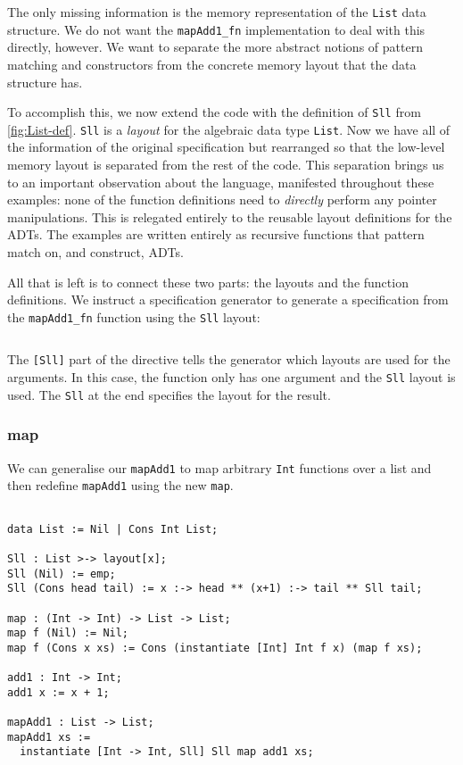 \noindent
The only missing information is the memory representation of the \verb|List| data structure. We do not want the
\verb|mapAdd1_fn| implementation to deal with this directly, however. We want to separate the more abstract notions
of pattern matching and constructors from the concrete memory layout that the data structure has.

To accomplish this, we now extend the code with the definition of
\verb|Sll| from \autoref{fig:List-def}. \verb|Sll| is a
\textit{layout} for the algebraic data type \verb|List|.
%
Now we have all of the information of the original specification but
rearranged so that the low-level memory layout is separated from the
rest of the code. This separation brings us to an important
observation about the language, manifested throughout these examples:
none of the function definitions need to \emph{directly} perform any
pointer manipulations. This is relegated entirely to the reusable
layout definitions for the ADTs. The examples are written entirely as
recursive functions that pattern match on, and construct, ADTs.

All that is left is to connect these two parts: the layouts and the
function definitions. We instruct a \SuSLik{} specification generator to
generate a \SuSLik{} specification from the \verb|mapAdd1_fn| function
using the \verb|Sll| layout:
%
\begin{lstlisting}[language=Pika]
%generate mapAdd1_fn [Sll] Sll
\end{lstlisting}
%
The \verb|[Sll]| part of the directive tells the generator which
layouts are used for the arguments. In this case, the function only
has one argument and the \verb|Sll| layout is used. The \verb|Sll| at
the end specifies the layout for the result.

\subsubsection{map}

We can generalise our \verb|mapAdd1| to map arbitrary \verb|Int|
functions over a list and then redefine \verb|mapAdd1| using the new
\verb|map|.

\begin{lstlisting}[language=Pika]
%generate mapAdd1 [Sll] Sll

data List := Nil | Cons Int List;

Sll : List >-> layout[x];
Sll (Nil) := emp;
Sll (Cons head tail) := x :-> head ** (x+1) :-> tail ** Sll tail;

map : (Int -> Int) -> List -> List;
map f (Nil) := Nil;
map f (Cons x xs) := Cons (instantiate [Int] Int f x) (map f xs);

add1 : Int -> Int;
add1 x := x + 1;

mapAdd1 : List -> List;
mapAdd1 xs :=
  instantiate [Int -> Int, Sll] Sll map add1 xs;
\end{lstlisting}


